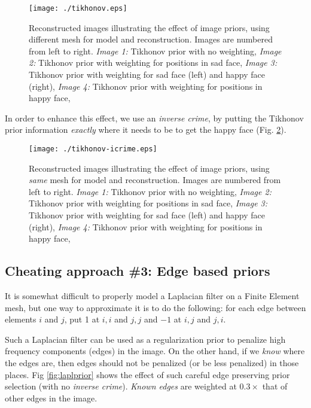 \documentclass[12pt]{iopart}
\begin{document}
%
%
\begin{figure}[th]
\begin{flushright}
\texttt{[image: ./tikhonov.eps]}
\caption{\small 
Reconstructed images illustrating the effect of image priors,
using different mesh for model and reconstruction.
Images are numbered from left to right.
{\em Image 1:} Tikhonov prior with no weighting,
{\em Image 2:} Tikhonov prior with weighting for positions in sad face,
{\em Image 3:} Tikhonov prior with weighting for sad face (left) and
happy face (right),
{\em Image 4:} Tikhonov prior with weighting for positions in happy face,
 }
 \label{fig:tikprior}
\end{flushright}
\end{figure}

In order to enhance this effect, we use an {\em inverse crime},
by putting the Tikhonov prior information {\em exactly} where
it needs to be to get the happy face (Fig. \ref{fig:tikprior_icrime}).

%
%
\begin{figure}[th]
\begin{flushright}
\texttt{[image: ./tikhonov-icrime.eps]}
\caption{\small 
Reconstructed images illustrating the effect of image priors,
using {\em same} mesh for model and reconstruction.
Images are numbered from left to right.
{\em Image 1:} Tikhonov prior with no weighting,
{\em Image 2:} Tikhonov prior with weighting for positions in sad face,
{\em Image 3:} Tikhonov prior with weighting for sad face (left) and
happy face (right),
{\em Image 4:} Tikhonov prior with weighting for positions in happy face,
 }
 \label{fig:tikprior_icrime}
\end{flushright}
\end{figure}


\subsection{ Cheating approach \#3:
             Edge based priors}

It is somewhat difficult to properly model a Laplacian filter
on a Finite Element mesh, but one way to approximate it is to
do the following: for each edge between elements $i$
and $j$, put 1 at $i,i$ and $j,j$
and $-1$ at $i,j$ and $j,i$.

Such a Laplacian filter can be used as a regularization prior
to penalize high frequency components (edges) in the image.
On the other hand, if we {\em know} where the edges are,
then edges should not be penalized (or be less penalized) in
those places. Fig \ref{fig:laplprior}
shows the effect of such careful
edge preserving prior selection (with no {\em inverse crime}).
{\em Known edges} are weighted at $0.3\times$ that of other
edges in the image.
\end{document}
